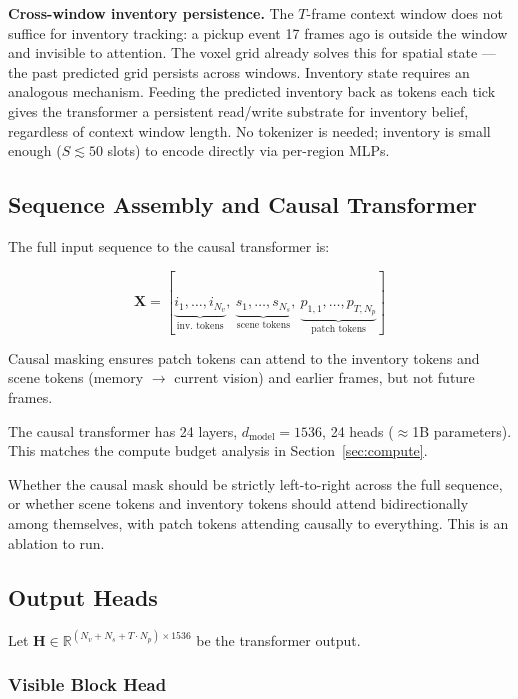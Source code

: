\documentclass[11pt,a4paper]{article}
\begin{document}
\begin{designdecision}
\textbf{Cross-window inventory persistence.} The $T$-frame context window does not suffice for inventory tracking: a pickup event 17 frames ago is outside the window and invisible to attention. The voxel grid already solves this for spatial state --- the past predicted grid persists across windows. Inventory state requires an analogous mechanism. Feeding the predicted inventory back as tokens each tick gives the transformer a persistent read/write substrate for inventory belief, regardless of context window length. No tokenizer is needed; inventory is small enough ($S \lesssim 50$ slots) to encode directly via per-region MLPs.
\end{designdecision}

\subsection{Sequence Assembly and Causal Transformer}

The full input sequence to the causal transformer is:

\[
\mathbf{X} = [\underbrace{i_1, \ldots, i_{N_v}}_{\text{inv.\ tokens}},\ \underbrace{s_1, \ldots, s_{N_s}}_{\text{scene tokens}},\ \underbrace{p_{1,1}, \ldots, p_{T,N_p}}_{\text{patch tokens}}]
\]

Causal masking ensures patch tokens can attend to the inventory tokens and scene tokens (memory $\rightarrow$ current vision) and earlier frames, but not future frames.

The causal transformer has 24 layers, $d_\text{model} = 1536$, 24 heads ($\approx$1B parameters). This matches the compute budget analysis in Section~\ref{sec:compute}.

\begin{openquestion}
Whether the causal mask should be strictly left-to-right across the full sequence, or whether scene tokens and inventory tokens should attend bidirectionally among themselves, with patch tokens attending causally to everything. This is an ablation to run.
\end{openquestion}

\subsection{Output Heads}

Let $\mathbf{H} \in \mathbb{R}^{(N_v + N_s + T \cdot N_p) \times 1536}$ be the transformer output.

\subsubsection{Visible Block Head}
\end{document}
